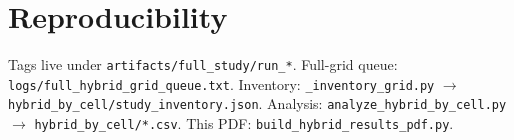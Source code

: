 \documentclass[10pt,a4paper]{article}
\begin{document}
\section{Reproducibility}
Tags live under \texttt{artifacts/full\_study/run\_*}.
Full-grid queue: \texttt{logs/full\_hybrid\_grid\_queue.txt}.
Inventory: \texttt{\_inventory\_grid.py} $\to$ \texttt{hybrid\_by\_cell/study\_inventory.json}.
Analysis: \texttt{analyze\_hybrid\_by\_cell.py} $\to$ \texttt{hybrid\_by\_cell/*.csv}.
This PDF: \texttt{build\_hybrid\_results\_pdf.py}.
\end{document}
